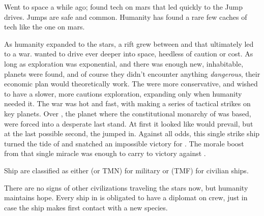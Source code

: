 \documentclass[blue]{TMFHope}
\begin{document}
\name{\bHistory{}}

Went to space a while ago; found tech on mars that led quickly to the Jump drives. Jumps are safe and common. Humanity has found a rare few caches of tech like the one on mars. 

As humanity expanded to the stars, a rift grew between \pPlan{} and \pEdge{} that ultimately led to a war. \pEdge{} wanted to drive ever deeper into space, heedless of caution or cost. As long as exploration was exponential, and there was enough new, inhabitable, planets were found, and of course they didn't encounter anything \emph{dangerous}, their economic plan would theoretically work. The \pPlan{} were more conservative, and wished to have a slower, more cautions exploration, expanding only when humanity needed it. The war was hot and fast, with \pEdge{} making a series of tactical strikes on key \pPlan{} planets. Over \pHome{}, the planet where the constitutional monarchy of \pPlan{} was based, \pPlan{} were forced into a desperate last stand. At first it looked like \pEdge{} would prevail, but at the last possible second, the \pOld{} jumped in. Against all odds, this single strike ship turned the tide of \pBattle{} and snatched an impossible victory for \pPlan{}. The morale boost from that single miracle was enough to carry \pPlan{} to victory against \pEdge{}.

Ship are classified as either \pTMN{} (or TMN) for military or \pTMF{} (TMF) for civilian ships.

There are no signs of other civilizations traveling the stars now, but humanity maintains hope. Every ship in \pTMF{} is obligated to have a diplomat on crew, just in case the ship makes first contact with a new species. 
\end{document}
